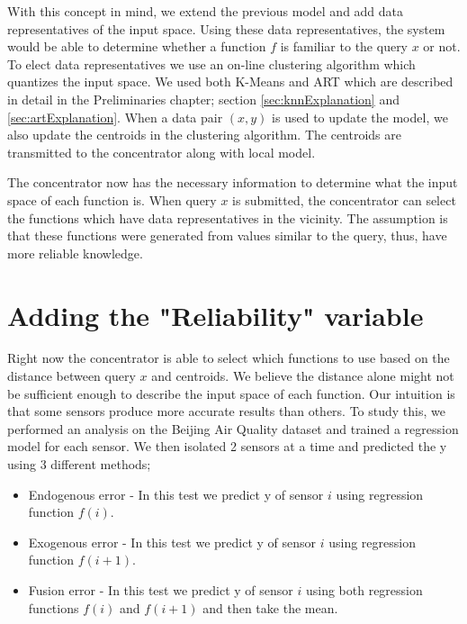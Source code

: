 \documentclass{mproj}
\begin{document}
With this concept in mind, we extend the previous model and add data representatives of the input space. Using these data representatives, the system would be able to determine whether a function $f$ is familiar to the query $x$ or not. To elect data representatives we use an on-line clustering algorithm which quantizes the input space. We used both K-Means and ART which are described in detail in the Preliminaries chapter; section \ref{sec:knnExplanation} and \ref{sec:artExplanation}. When a data pair $(x,y)$ is used to update the model, we also update the centroids in the clustering algorithm. The centroids are transmitted to the concentrator along with local model.

The concentrator now has the necessary information to determine what the input space of each function is. When query $x$ is submitted, the concentrator can select the functions which have data representatives in the vicinity. The assumption is that these functions were generated from values similar to the query, thus, have more reliable knowledge.

\section{Adding the "Reliability" variable}
\label{sec:reliabilityVariable}
Right now the concentrator is able to select which functions to use based on the distance between query $x$ and centroids. We believe the distance alone might not be sufficient enough to describe the input space of each function. Our intuition is that some sensors produce more accurate results than others. To study this, we performed an analysis on the Beijing Air Quality dataset \cite{air-quality-inference-meets-big-data} and trained a regression model for each sensor. We then isolated 2 sensors at a time and predicted the y using 3 different methods; 

\begin{itemize}  
\item Endogenous error - In this test we predict y of sensor $i$ using regression function $f(i)$.
\item Exogenous error - In this test we predict y of sensor $i$ using regression function $f(i+1)$.
\item Fusion error - In this test we predict y of sensor $i$ using both regression functions $f(i)$ and $f(i+1)$ and then take the mean.
\end{itemize}
\end{document}
